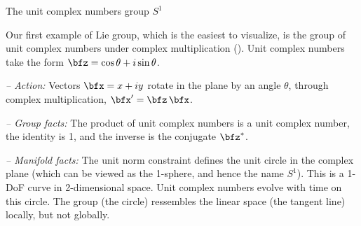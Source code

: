 

\begin{fexample}	{The unit complex numbers group $S^1$}
\label{ex:S1}

Our first example of Lie group, which is the easiest to visualize, is the group of unit complex numbers under complex multiplication ().
Unit complex numbers take the form $\bfz=\cos\theta+i\sin\theta$.

\emph{-- Action:}
 Vectors $\bfx=x+iy$ rotate in the plane by an angle $\theta$, through complex multiplication, $\bfx'=\bfz\,\bfx$. 

\emph{-- Group facts:}
The product of unit complex numbers is a unit complex number, the identity is 1, and the inverse is the conjugate $\bfz^*$.

\emph{-- Manifold facts:} 
The unit norm constraint defines the unit circle in the complex plane (which can be viewed as the 1-sphere, and hence the name $S^1$).
This is a  1-DoF curve in 2-dimensional space. 
Unit complex numbers evolve with time on this circle.
The group (the circle) ressembles the linear space (the tangent line) locally, but not globally.
\end{fexample}
